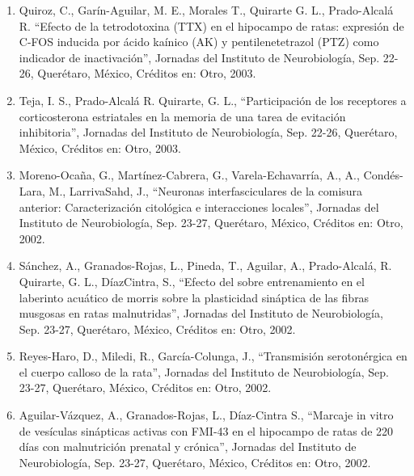 \begin{enumerate}
\item  Quiroz, C., Garín-Aguilar, M. E., Morales T., Quirarte G. L., Prado-Alcalá R. “Efecto de la tetrodotoxina (TTX) en el 
hipocampo de ratas: expresión de C-FOS inducida por ácido kaínico (AK) y pentilenetetrazol (PTZ) como indicador de 
inactivación”, Jornadas del Instituto de Neurobiología, Sep. 22-26, Querétaro, México, Créditos en: Otro, 2003.

\item Teja, I. S., Prado-Alcalá R. Quirarte, G. L., “Participación de los receptores a corticosterona estriatales en la 
memoria 
de una tarea de evitación inhibitoria”, Jornadas del Instituto de Neurobiología, Sep. 22-26, Querétaro, México, Créditos en: 
Otro, 2003.

\item Moreno-Ocaña, G., Martínez-Cabrera, G., Varela-Echavarría, A., A., Condés-Lara, M., LarrivaSahd, J., “Neuronas 
interfasciculares de la comisura anterior: Caracterización citológica e interacciones locales”, Jornadas del Instituto de 
Neurobiología, Sep. 23-27, Querétaro, México, Créditos en: Otro, 2002.

\item Sánchez, A., Granados-Rojas, L., Pineda, T., Aguilar, A., Prado-Alcalá, R. Quirarte, G. L., DíazCintra, S., “Efecto del 
sobre entrenamiento en el laberinto acuático de morris sobre la plasticidad sináptica de las fibras musgosas en ratas 
malnutridas”, Jornadas del Instituto de Neurobiología, Sep. 23-27, Querétaro, México, Créditos en: Otro, 2002.

\item Reyes-Haro, D., Miledi, R., García-Colunga, J., “Transmisión serotonérgica en el cuerpo calloso de la rata”, Jornadas 
del 
Instituto de Neurobiología, Sep. 23-27, Querétaro, México, Créditos en: Otro, 2002.

\item Aguilar-Vázquez, A., Granados-Rojas, L., Díaz-Cintra S., “Marcaje in vitro de vesículas sinápticas activas con FMI-43 
en 
el hipocampo de ratas de 220 días con malnutrición prenatal y crónica”, Jornadas del Instituto de Neurobiología, Sep. 23-27, 
Querétaro, México, Créditos en: Otro, 2002.

\end{enumerate}
